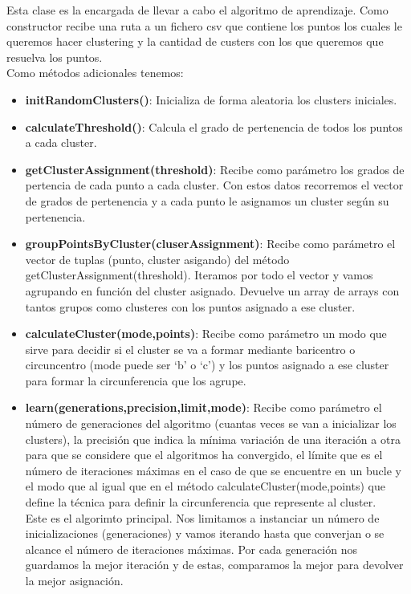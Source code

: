 \documentclass[conference,a4paper]{IEEEtran}
\begin{document}
Esta clase es la encargada de llevar a cabo el algoritmo de aprendizaje. Como constructor recibe una ruta a un fichero csv que contiene los puntos los cuales le queremos hacer clustering y la cantidad de custers con los que queremos que resuelva los puntos.\\

Como métodos adicionales tenemos:\\

\begin{itemize}

	\item{\textbf{initRandomClusters()}: Inicializa de forma aleatoria los clusters iniciales.}\\
	\item{\textbf{calculateThreshold()}: Calcula el grado de pertenencia de todos los puntos a cada cluster.}\\
	\item{\textbf{getClusterAssignment(threshold)}: Recibe como parámetro los grados de pertencia de cada punto a cada cluster. Con estos datos recorremos el vector de grados de pertenencia y a cada punto le asignamos un cluster según su pertenencia.}\\
	\item{\textbf{groupPointsByCluster(cluserAssignment)}: Recibe como parámetro el vector de tuplas (punto, cluster asigando) del método getClusterAssignment(threshold). Iteramos por todo el vector y vamos agrupando en función del cluster asignado. Devuelve un array de arrays con tantos grupos como clusteres con los puntos asignado a ese cluster.}\\
	\item{\textbf{calculateCluster(mode,points)}: Recibe como parámetro un modo que sirve para decidir si el cluster se va a formar mediante baricentro o circuncentro (mode puede ser ‘b’ o ‘c’) y los puntos asignado a ese cluster para formar la circunferencia que los agrupe.}\\
	\item{\textbf{learn(generations,precision,limit,mode)}: Recibe como parámetro el número de generaciones del algoritmo (cuantas veces se van a inicializar los clusters), la precisión que indica la mínima variación de una iteración a otra para que se considere que el algoritmos ha convergido, el límite que es el número de iteraciones máximas en el caso de que se encuentre en un bucle y el modo que al igual que en el método calculateCluster(mode,points) que define la técnica para definir la circunferencia que represente al cluster.\\

Este es el algorimto principal. Nos limitamos a instanciar un número de inicializaciones (generaciones) y vamos iterando hasta que converjan o se alcance el número de iteraciones máximas. Por cada generación nos guardamos la mejor iteración y de estas, comparamos la mejor para devolver la mejor asignación.}\\

\end{itemize}
\end{document}
